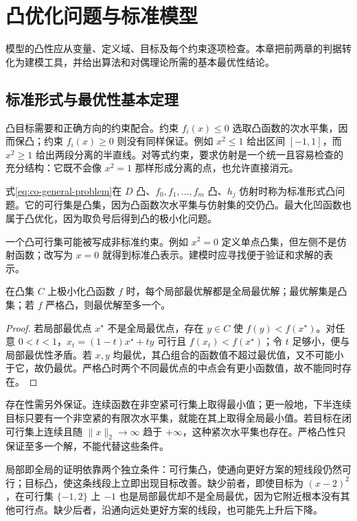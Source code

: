 \setcounter{chapter}{3} %
\chapter{凸优化问题与标准模型}
\label{ch:co-models}

模型的凸性应从变量、定义域、目标及每个约束逐项检查。本章把前两章的判据转化为建模工具，并给出算法和对偶理论所需的基本最优性结论。

\section{标准形式与最优性基本定理}

凸目标需要和正确方向的约束配合。约束 $f_i(x)\leq0$ 选取凸函数的次水平集，因而保凸；约束 $f_i(x)\geq0$ 则没有同样保证。例如 $x^2\leq1$ 给出区间 $[-1,1]$，而 $x^2\geq1$ 给出两段分离的半直线。对等式约束，要求仿射是一个统一且容易检查的充分结构：它既不会像 $x^2=1$ 那样形成分离的点，也允许直接消元。

式\eqref{eq:co-general-problem}在 $D$ 凸、$f_0,f_1,\ldots,f_m$ 凸、$h_j$ 仿射时称为标准形式凸问题。它的可行集是凸集，因为凸函数次水平集与仿射集的交仍凸。最大化凹函数也属于凸优化，因为取负号后得到凸的极小化问题。

一个凸可行集可能被写成非标准约束。例如 $x^2=0$ 定义单点凸集，但左侧不是仿射函数；改写为 $x=0$ 就得到标准凸表示。建模时应寻找便于验证和求解的表示。

\begin{theorem}[凸问题的最优解]
在凸集 $C$ 上极小化凸函数 $f$ 时，每个局部最优解都是全局最优解；最优解集是凸集；若 $f$ 严格凸，则最优解至多一个。
\end{theorem}
\begin{proof}
若局部最优点 $x^\star$ 不是全局最优点，存在 $y\in C$ 使 $f(y)<f(x^\star)$。对任意 $0<t<1$，$x_t=(1-t)x^\star+ty$ 可行且 $f(x_t)<f(x^\star)$；令 $t$ 足够小，便与局部最优性矛盾。若 $x,y$ 均最优，其凸组合的函数值不超过最优值，又不可能小于它，故仍最优。严格凸时两个不同最优点的中点会有更小函数值，故不能同时存在。
\end{proof}

存在性需另外保证。连续函数在非空紧可行集上取得最小值；更一般地，下半连续目标只要有一个非空紧的有限次水平集，就能在其上取得全局最小值。若目标在闭可行集上连续且随 $\|x\|_2\to\infty$ 趋于 $+\infty$，这种紧次水平集也存在。严格凸性只保证至多一个解，不能代替这些条件。

局部即全局的证明依靠两个独立条件：可行集凸，使通向更好方案的短线段仍然可行；目标凸，使这条线段上立即出现目标改善。缺少前者，即使目标为 $(x-2)^2$，在可行集 $\{-1,2\}$ 上 $-1$ 也是局部最优却不是全局最优，因为它附近根本没有其他可行点。缺少后者，沿通向远处更好方案的线段，也可能先上升后下降。

